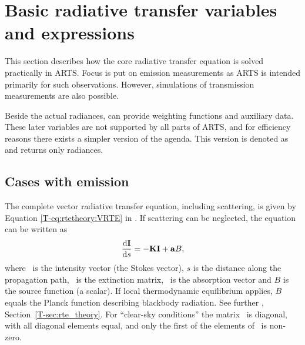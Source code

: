\section{Basic radiative transfer variables and expressions}
\label{sec:fm_defs:rte}

This section describes how the core radiative transfer equation is solved
practically in ARTS. Focus is put on emission measurements as ARTS is
intended primarily for such observations. However, simulations of transmission
measurements are also possible.

Beside the actual radiances,  can provide
weighting functions and auxiliary data. These later variables are not supported
by all parts of ARTS, and for efficiency reasons there exists a simpler version
of the agenda. This version is denoted as
 and returns only radiances.


\subsection{Cases with emission}
\label{sec:fm_defs:emission}

The complete vector radiative transfer equation, including scattering, is given
by Equation \ref{T-eq:rtetheory:VRTE} in \theory. If scattering can be
neglected, the equation can be written as
\begin{equation}
  \label{eq:rte:vrte}
  \frac {\mathrm{d}{\bf I}}{\mathrm{d} s} = -{\bf K}{\bf I} + {\bf a} B,
\end{equation}
where \StoVec\ is the intensity vector (the Stokes vector), $s$ is the distance
along the propagation path, \ExtMat\ is the extinction matrix, \AbsVec\ is the
absorption vector and $B$ is the source function (a scalar). If local
thermodynamic equilibrium applies, $B$ equals the Planck function describing
blackbody radiation. See further \theory, Section~\ref{T-sec:rte_theory}. For
``clear-sky conditions'' the matrix \ExtMat\ is diagonal, with all diagonal
elements equal, and only the first of the elements of \AbsVec\ is non-zero.

